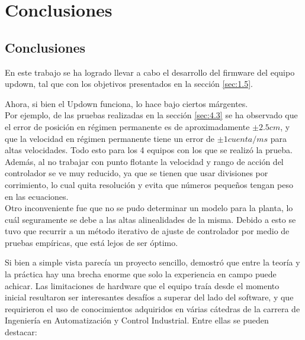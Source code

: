 \chapter{Conclusiones}
\thispagestyle{empty}

\section{Conclusiones} \label{sec:\thesection}
En este trabajo se ha logrado llevar a cabo el desarrollo del firmware del equipo updown, tal que con los objetivos presentados en la sección \ref{sec:1.5}. 

Ahora, si bien el Updown funciona, lo hace bajo ciertos márgentes.\\
Por ejemplo, de las pruebas realizadas en la sección \ref{sec:4.3} se ha observado que el error de posición en régimen permanente es de aproximadamente \( \pm 2.5cm \), y que la velocidad en régimen permanente tiene un error de \( \pm 1 cuenta/ms \) para altas velocidades. Todo esto para los 4 equipos con los que se realizó la prueba. \\
Además, al no trabajar con punto flotante la velocidad y rango de acción del controlador se ve muy reducido, ya que se tienen que usar divisiones por corrimiento, lo cual quita resolución y evita que números pequeños tengan peso en las ecuaciones.\\
Otro inconveniente fue que no se pudo determinar un modelo para la planta, lo cuál seguramente se debe a las altas alinealidades de la misma. Debido a esto se tuvo que recurrir a un método iterativo de ajuste de controlador por medio de pruebas empíricas, que está lejos de ser óptimo.

Si bien a simple vista parecía un proyecto sencillo, demostró que entre la teoría y la práctica hay una brecha enorme que solo la experiencia en campo puede achicar. Las limitaciones de hardware que el equipo traía desde el momento inicial resultaron ser interesantes desafíos a superar del lado del software, y que requirieron el uso de conocimientos adquiridos en várias cátedras de la carrera de Ingeniería en Automatización y Control Industrial. Entre ellas se pueden destacar:

